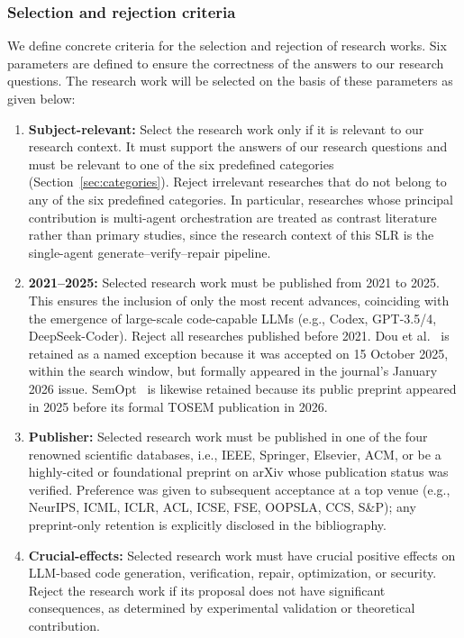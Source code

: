 \documentclass[10pt,a4paper]{article}
\begin{document}
\subsubsection{Selection and rejection criteria}
\label{sec:criteria}
We define concrete criteria for the selection and rejection of research works. Six parameters are defined to ensure the correctness of the answers to our research questions. The research work will be selected on the basis of these parameters as given below:

\begin{enumerate}[leftmargin=*]
\item \textbf{Subject-relevant:} Select the research work only if it is relevant to our research context. It must support the answers of our research questions and must be relevant to one of the six predefined categories (Section~\ref{sec:categories}). Reject irrelevant researches that do not belong to any of the six predefined categories. In particular, researches whose principal contribution is multi-agent orchestration are treated as contrast literature rather than primary studies, since the research context of this SLR is the single-agent generate--verify--repair pipeline.
\item \textbf{2021--2025:} Selected research work must be published from 2021 to 2025. This ensures the inclusion of only the most recent advances, coinciding with the emergence of large-scale code-capable LLMs (e.g., Codex, GPT-3.5/4, DeepSeek-Coder). Reject all researches published before 2021. Dou et al.~\cite{dou2026} is retained as a named exception because it was accepted on 15 October 2025, within the search window, but formally appeared in the journal's January 2026 issue. SemOpt~\cite{zhao2025semopt} is likewise retained because its public preprint appeared in 2025 before its formal TOSEM publication in 2026.
\item \textbf{Publisher:} Selected research work must be published in one of the four renowned scientific databases, i.e., IEEE, Springer, Elsevier, ACM, or be a highly-cited or foundational preprint on arXiv whose publication status was verified. Preference was given to subsequent acceptance at a top venue (e.g., NeurIPS, ICML, ICLR, ACL, ICSE, FSE, OOPSLA, CCS, S\&P); any preprint-only retention is explicitly disclosed in the bibliography.
\item \textbf{Crucial-effects:} Selected research work must have crucial positive effects on LLM-based code generation, verification, repair, optimization, or security. Reject the research work if its proposal does not have significant consequences, as determined by experimental validation or theoretical contribution.

\end{enumerate}
\end{document}
